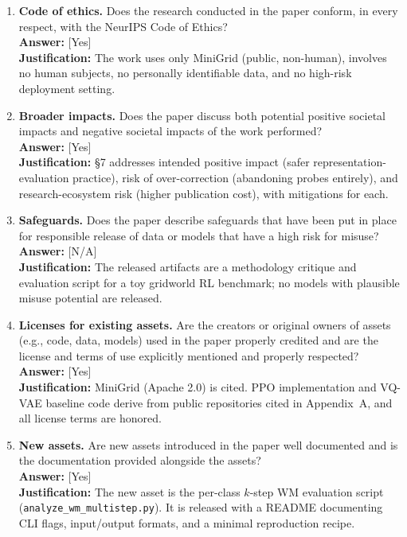 \begin{enumerate}
  \item \textbf{Code of ethics.} Does the research conducted in the paper conform, in every respect, with the NeurIPS Code of Ethics?\\
  \textbf{Answer:} [Yes]\\
  \textbf{Justification:} The work uses only MiniGrid (public, non-human), involves no human subjects, no personally identifiable data, and no high-risk deployment setting.

  \item \textbf{Broader impacts.} Does the paper discuss both potential positive societal impacts and negative societal impacts of the work performed?\\
  \textbf{Answer:} [Yes]\\
  \textbf{Justification:} \S7 addresses intended positive impact (safer representation-evaluation practice), risk of over-correction (abandoning probes entirely), and research-ecosystem risk (higher publication cost), with mitigations for each.

  \item \textbf{Safeguards.} Does the paper describe safeguards that have been put in place for responsible release of data or models that have a high risk for misuse?\\
  \textbf{Answer:} [N/A]\\
  \textbf{Justification:} The released artifacts are a methodology critique and evaluation script for a toy gridworld RL benchmark; no models with plausible misuse potential are released.

  \item \textbf{Licenses for existing assets.} Are the creators or original owners of assets (e.g., code, data, models) used in the paper properly credited and are the license and terms of use explicitly mentioned and properly respected?\\
  \textbf{Answer:} [Yes]\\
  \textbf{Justification:} MiniGrid (Apache 2.0) is cited. PPO implementation and VQ-VAE baseline code derive from public repositories cited in Appendix~A, and all license terms are honored.

  \item \textbf{New assets.} Are new assets introduced in the paper well documented and is the documentation provided alongside the assets?\\
  \textbf{Answer:} [Yes]\\
  \textbf{Justification:} The new asset is the per-class $k$-step WM evaluation script (\texttt{analyze\_wm\_multistep.py}). It is released with a README documenting CLI flags, input/output formats, and a minimal reproduction recipe.


\end{enumerate}
